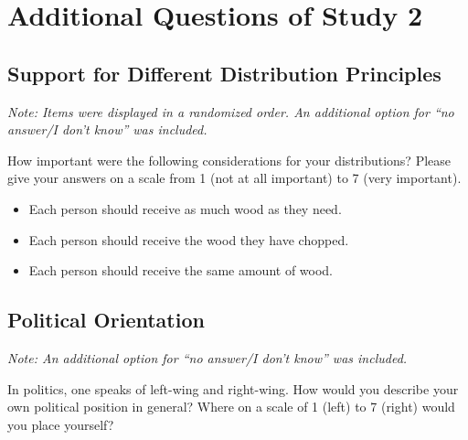\documentclass[egregdoesnotlikesansseriftitles]{scrartcl}
\begin{document}
\clearpage
\section{Additional Questions of Study 2}\label{sec:app_study_2_additional_questions}
\subsection*{Support for Different Distribution Principles}
\noindent\textit{Note: Items were displayed in a randomized order. An additional option for ``no answer/I don't know'' was included.}\vspace{1ex}

\noindent How important were the following considerations for your distributions? %
Please give your answers on a scale from 1 (not at all important) to 7 (very important). %

\begin{itemize}
   \item Each person should receive as much wood as they need. %
   \item Each person should receive the wood they have chopped. %
   \item Each person should receive the same amount of wood. %
\end{itemize}

\subsection*{Political Orientation}
\noindent\textit{Note: An additional option for ``no answer/I don't know'' was included.}\vspace{1ex}

\noindent In politics, one speaks of left-wing and right-wing. %
How would you describe your own political position in general? %
Where on a scale of 1 (left) to 7 (right) would you place yourself? %
\end{document}
